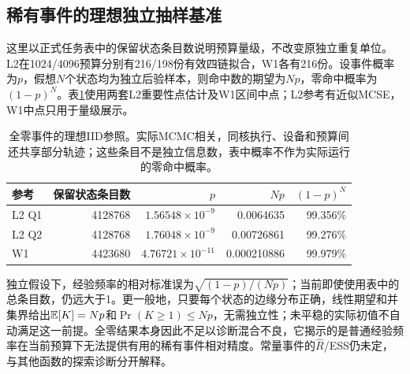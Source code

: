 \subsection{稀有事件的理想独立抽样基准}
\label{sec:rare-iid}
这里以正式任务表中的保留状态条目数说明预算量级，不改变原独立重复单位。L2在1024/4096预算分别有216/198份有效四链拟合，W1各有216份。设事件概率为$p$，假想$N$个状态均为独立后验样本，则命中数的期望为$Np$，零命中概率为$(1-p)^N$。表\ref{tab:rare-iid}使用两套L2重要性点估计及W1区间中点；L2参考有近似MCSE，W1中点只用于量级展示。
\begin{table}[htbp]\centering\small
\begin{tabular}{lrrrr}\toprule
参考 & 保留状态条目数 & $p$ & $Np$ & $(1-p)^N$\\\midrule
L2 Q1 & 4128768 & $1.56548\times10^{-9}$ & 0.0064635 & 99.356\%\\
L2 Q2 & 4128768 & $1.76048\times10^{-9}$ & 0.00726861 & 99.276\%\\
W1 & 4423680 & $4.76721\times10^{-11}$ & 0.000210886 & 99.979\%\\
\bottomrule\end{tabular}
\caption{全零事件的理想IID参照。实际MCMC相关，同核执行、设备和预算间还共享部分轨迹；这些条目不是独立信息数，表中概率不作为实际运行的零命中概率。}
\label{tab:rare-iid}\end{table}
\FloatBarrier
独立假设下，经验频率的相对标准误为$\sqrt{(1-p)/(Np)}$；当前即使使用表中的总条目数，仍远大于1。更一般地，只要每个状态的边缘分布正确，线性期望和并集界给出$\mathbb{E}[K]=Np$和$\Pr(K\geq1)\leq Np$，无需独立性；未平稳的实际初值不自动满足这一前提。全零结果本身因此不足以诊断混合不良，它揭示的是普通经验频率在当前预算下无法提供有用的稀有事件相对精度。常量事件的$\hat R$/ESS仍未定，与其他函数的探索诊断分开解释。
